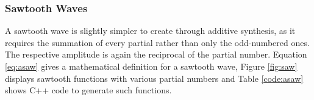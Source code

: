 \documentclass[12pt,twoside]{report}
\begin{document}
\begin{figure}

  \TopFloatBoxes

  \begin{floatrow}



  \end{floatrow}

\end{figure}

\pagebreak

\subsubsection{Sawtooth Waves}

A sawtooth wave is slightly simpler to create through additive synthesis, as it requires the summation of every partial rather than only the odd-numbered ones. The respective amplitude is again the reciprocal of the partial number. Equation \ref{eq:asaw} gives a mathematical definition for a sawtooth wave, Figure \ref{fig:saw} displays sawtooth functions with various partial numbers and Table \ref{code:asaw} shows C++ code to generate such functions.
\end{document}
